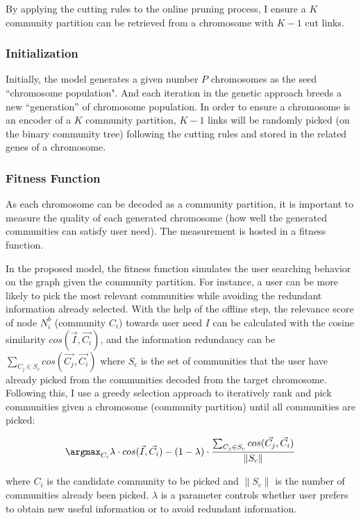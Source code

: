 By applying the cutting rules to the online pruning process, I ensure a $K$ community partition can be retrieved from a chromosome with $K-1$ cut links.  


\subsubsection{Initialization}

Initially, the model generates a given number $P$  chromosomes as the seed ``chromosome population". And each iteration in the genetic approach breeds a new ``generation'' of chromosome population. In order to ensure a chromosome is an encoder of a $K$ community partition, $K-1$ links will be randomly picked (on the binary community tree) following the cutting rules and stored in the related genes of a chromosome. 

\subsubsection{Fitness Function} 

As each chromosome can be decoded as a community partition, it is important to measure the quality of each generated chromosome (how well the generated communities can satisfy user need). The measurement is hosted in a fitness function. 


In the proposed model, the fitness function simulates the user searching behavior on the graph given the community partition. For instance, a user can be more likely to pick the most relevant communities while avoiding the redundant information already selected. With the help of the offline step, the relevance score of node $N_{i}^{b}$ (community $C_{i}$) towards user need $I$ can be calculated with the cosine similarity $cos(\vec{I},\vec{C_{i}})$, and the information redundancy can be $\sum_{C_{j} \in S_c}cos(\vec{C_{j}},\vec{C_{i}})$ where $S_{c}$ is the set of communities that the user have already picked from the communities decoded from the target chromosome. Following this, I use a greedy selection approach to iteratively rank and pick communities given a chromosome (community partition) until all communities are picked: 

\begin{equation}  \argmax_{C_{i}}\lambda \cdot cos(\vec{I},\vec{C_{i}})-(1-\lambda)\cdot \frac{\sum_{C_{j} \in S_c}^{ }cos( \vec{C_j},\vec{C_{i}})}{\lVert S_c\rVert}
\end{equation} 

where $C_i$ is the candidate community to be picked and $\lVert S_c\rVert$ is the number of communities already been picked. $\lambda$ is a parameter controls  whether user prefers to obtain new useful information or to avoid redundant information.  

